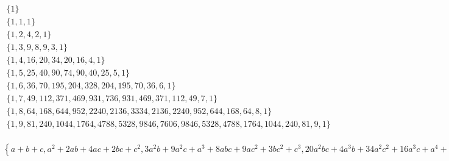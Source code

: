 $
\begin{array}{c}
\{1\} \\
\{1,1,1\} \\
\{1,2,4,2,1\} \\
\{1,3,9,8,9,3,1\} \\
\{1,4,16,20,34,20,16,4,1\} \\
\{1,5,25,40,90,74,90,40,25,5,1\} \\
\{1,6,36,70,195,204,328,204,195,70,36,6,1\} \\
\{1,7,49,112,371,469,931,736,931,469,371,112,49,7,1\} \\
\{1,8,64,168,644,952,2240,2136,3334,2136,2240,952,644,168,64,8,1\} \\
\{1,9,81,240,1044,1764,4788,5328,9846,7606,9846,5328,4788,1764,1044,240,81,9,1\} \\
\end{array}
$

\newpage
$
\left\{a+b+c,a^2+2 a b+4 a c+2 b c+c^2,3 a^2 b+9 a^2 c+a^3+8 a b c+9 a c^2+3 b c^2+c^3,20 a^2 b c+4 a^3 b+34 a^2 c^2+16 a^3 c+a^4+20 a b c^2+16 a c^3+4 b c^3+c^4,74 a^2 b c^2+40 a^3 b c+5 a^4 b+90 a^3 c^2+90 a^2 c^3+25 a^4 c+a^5+40 a b c^3+25 a c^4+5 b c^4+c^5,204 a^3 b c^2+204 a^2 b c^3+70 a^4 b c+6 a^5 b+195 a^4 c^2+328 a^3 c^3+195 a^2 c^4+36 a^5 c+a^6+70 a b c^4+36 a c^5+6 b c^5+c^6,469 a^4 b c^2+736 a^3 b c^3+469 a^2 b c^4+112 a^5 b c+7 a^6 b+371 a^5 c^2+931 a^4 c^3+931 a^3 c^4+371 a^2 c^5+49 a^6 c+a^7+112 a b c^5+49 a c^6+7 b c^6+c^7,952 a^5 b c^2+2136 a^4 b c^3+2136 a^3 b c^4+952 a^2 b c^5+168 a^6 b c+8 a^7 b+644 a^6 c^2+2240 a^5 c^3+3334 a^4 c^4+2240 a^3 c^5+644 a^2 c^6+64 a^7 c+a^8+168 a b c^6+64 a c^7+8 b c^7+c^8,1764 a^6 b c^2+5328 a^5 b c^3+7606 a^4 b c^4+5328 a^3 b c^5+1764 a^2 b c^6+240 a^7 b c+9 a^8 b+1044 a^7 c^2+4788 a^6 c^3+9846 a^5 c^4+9846 a^4 c^5+4788 a^3 c^6+1044 a^2 c^7+81 a^8 c+a^9+240 a b c^7+81 a c^8+9 b c^8+c^9,3048 a^7 b c^2+11880 a^6 b c^3+22780 a^5 b c^4+22780 a^4 b c^5+11880 a^3 b c^6+3048 a^2 b c^7+330 a^8 b c+10 a^9 b+1605 a^8 c^2+9360 a^7 c^3+25290 a^6 c^4+34904 a^5 c^5+25290 a^4 c^6+9360 a^3 c^7+1605 a^2 c^8+100 a^9 c+a^{10}+330 a b c^8+100 a c^9+10 b c^9+c^{10}\right\}
$